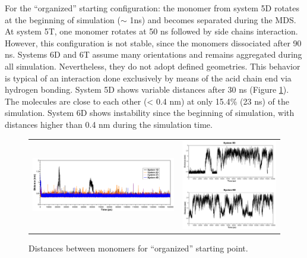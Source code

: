 For the ``organized'' starting configuration: the monomer from system 5D rotates at the beginning of simulation ($\sim$ 1ns) and becomes separated during the MDS. At system 5T, one monomer rotates at 50 ns followed by side chains interaction. However, this configuration is not stable, since the monomers dissociated after 90 ns. Systems 6D and 6T assume many orientations and remains aggregated during all simulation. Nevertheless, they do not adopt defined geometries. This behavior is typical of an interaction done exclusively by means of the acid chain end via hydrogen bonding. System 5D shows variable distances after 30 ns (Figure \ref{pap:fig07}). The molecules are close to each other (< 0.4 nm) at only 15.4\% (23 ns) of the simulation. System 6D shows instability since the beginning of simulation, with distances higher than 0.4 nm during the simulation time.  

\begin{figure}[htb]
	\centering
	\begin{tabular}{cc}
		\includegraphics[width=0.45\columnwidth]{image/Figure4}&
		\includegraphics[width=0.45\columnwidth]{image/Figure4b}\\
	\end{tabular}
	\caption{Distances between monomers for ``organized'' starting point.}
	\label{pap:fig07}
\end{figure}

